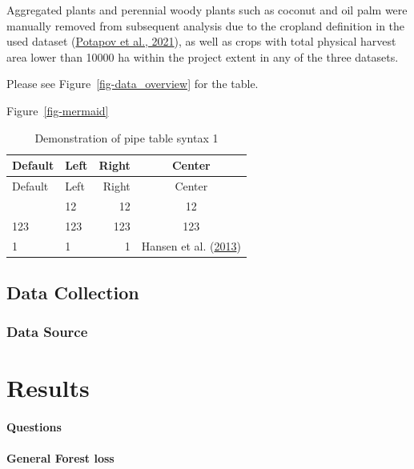 \documentclass[
  letterpaper,
  DIV=11,
  numbers=noendperiod]{scrreprt}
\begin{document}
Aggregated plants and perennial woody plants such as coconut and oil
palm were manually removed from subsequent analysis due to the cropland
definition in the used dataset
(\protect\hyperlink{ref-potapovGlobalMapsCropland2021}{Potapov et al.,
2021}), as well as crops with total physical harvest area lower than
10000 ha within the project extent in any of the three datasets.

Please see Figure~\ref{fig-data_overview} for the table.

Figure~\ref{fig-mermaid}

\begin{longtable}[]{@{}llrc@{}}
\caption{Demonstration of pipe table syntax 1}\tabularnewline
\toprule\noalign{}
Default & Left & Right & Center \\
\midrule\noalign{}
\endfirsthead
\toprule\noalign{}
Default & Left & Right & Center \\
\midrule\noalign{}
\endhead
\bottomrule\noalign{}
\endlastfoot
12 & 12 & 12 & 12 \\
123 & 123 & 123 & 123 \\
1 & 1 & 1 & Hansen et al.
(\protect\hyperlink{ref-hansenHighResolutionGlobalMaps2013}{2013}) \\
\end{longtable}

\hypertarget{data-collection}{%
\section{Data Collection}\label{data-collection}}

\hypertarget{data-source}{%
\subsection{Data Source}\label{data-source}}


\hypertarget{results}{%
\chapter{Results}\label{results}}

\hypertarget{questions}{%
\subsubsection{Questions}\label{questions}}

\hypertarget{general-forest-loss}{%
\subsubsection{General Forest loss}\label{general-forest-loss}}
\end{document}
